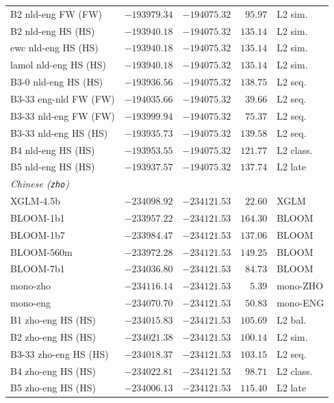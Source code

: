 \begin{table}[t]
\begin{tabular}{lrrrl}
    B2 nld-eng FW (FW) & $-193979.34$ & $-194075.32$ & $95.97$ & L2 sim. \\
    B2 nld-eng HS (HS) & $-193940.18$ & $-194075.32$ & $135.14$ & L2 sim. \\
    ewc nld-eng HS (HS) & $-193940.18$ & $-194075.32$ & $135.14$ & L2 sim. \\
    lamol nld-eng HS (HS) & $-193940.18$ & $-194075.32$ & $135.14$ & L2 sim. \\
    B3-0 nld-eng HS (HS) & $-193936.56$ & $-194075.32$ & $138.75$ & L2 seq. \\
    B3-33 eng-nld FW (FW) & $-194035.66$ & $-194075.32$ & $39.66$ & L2 seq. \\
    B3-33 nld-eng FW (FW) & $-193999.94$ & $-194075.32$ & $75.37$ & L2 seq. \\
    B3-33 nld-eng HS (HS) & $-193935.73$ & $-194075.32$ & $139.58$ & L2 seq. \\
    B4 nld-eng HS (HS) & $-193953.55$ & $-194075.32$ & $121.77$ & L2 class. \\
    B5 nld-eng HS (HS) & $-193937.57$ & $-194075.32$ & $137.74$ & L2 late \\
    \midrule
    \multicolumn{5}{l}{\textit{Chinese (\texttt{zho})}} \\
    \midrule
    XGLM-4.5b & $-234098.92$ & $-234121.53$ & $22.60$ & XGLM \\
    BLOOM-1b1 & $-233957.22$ & $-234121.53$ & $164.30$ & BLOOM \\
    BLOOM-1b7 & $-233984.47$ & $-234121.53$ & $137.06$ & BLOOM \\
    BLOOM-560m & $-233972.28$ & $-234121.53$ & $149.25$ & BLOOM \\
    BLOOM-7b1 & $-234036.80$ & $-234121.53$ & $84.73$ & BLOOM \\
    mono-zho & $-234116.14$ & $-234121.53$ & $5.39$ & mono-ZHO \\
    mono-eng & $-234070.70$ & $-234121.53$ & $50.83$ & mono-ENG \\
    B1 zho-eng HS (HS) & $-234015.83$ & $-234121.53$ & $105.69$ & L2 bal. \\
    B2 zho-eng HS (HS) & $-234021.38$ & $-234121.53$ & $100.14$ & L2 sim. \\
    B3-33 zho-eng HS (HS) & $-234018.37$ & $-234121.53$ & $103.15$ & L2 seq. \\
    B4 zho-eng HS (HS) & $-234022.81$ & $-234121.53$ & $98.71$ & L2 class. \\
    B5 zho-eng HS (HS) & $-234006.13$ & $-234121.53$ & $115.40$ & L2 late \\

\end{tabular}
\end{table}
